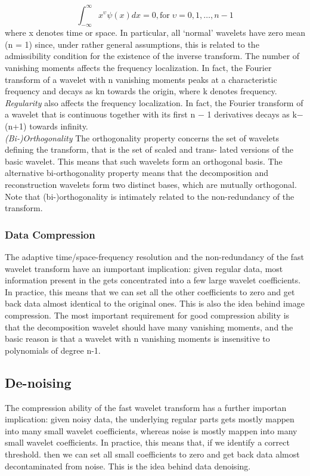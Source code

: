 \documentclass[12pt]{article}
\begin{document}
			\begin{equation}
				\int_{-\infty}^\infty x^\upsilon \psi(x)dx=0, \mathrm{for }\;\upsilon = 0,1, \dots , n −1
			\end{equation}
			where x denotes time or space. In particular, all ‘normal’ wavelets have zero mean (n = 1) since, under rather general assumptions, this is related to the admissibility condition for the existence of the inverse transform. The number of vanishing moments affects the frequency localization. In fact, the Fourier transform of a wavelet with n vanishing moments peaks at a characteristic frequency and decays as kn towards the origin, where k denotes frequency.\\
			\textit{Regularity} also affects the frequency localization. In fact, the Fourier transform of a wavelet that is continuous together with its first n − 1 derivatives decays as k−(n+1) towards infinity.\\
			\textit{(Bi-)Orthogonality} The orthogonality property concerns the set of wavelets defining the transform, that is the set of scaled and trans- lated versions of the basic wavelet. This means that such wavelets form an orthogonal basis. The alternative bi-orthogonality property means that the decomposition and reconstruction wavelets form two distinct bases, which are mutually orthogonal. Note that (bi-)orthogonality is intimately related to the non-redundancy of the transform.

	    \subsubsection{Data Compression}
	    The adaptive time/space-frequency resolution and the non-redundancy of the fast wavelet transform have an iumportant implication: 
	    given regular data, most information present in the gets concentrated into a few large
	    wavelet coefficients. In practice, this means that we can set all the
	    other coefficients to zero and get back data almost identical to the
	    original ones. This is also the idea behind image compression. The most
	    important requirement for good compression ability is that the
	    decomposition wavelet should have many vanishing moments, and the basic
	    reason is that a wavelet with n vanishing moments is insensitive to
	    polynomials of degree n-1. 
	    
	    \subsection{De-noising}
	    The compression ability of the fast wavelet transform has a further
	    importan implication: given noisy data, the underlying regular parts gets
	    mostly mappen into many small wavelet coefficients, whereas noise is
	    mostly mappen into many small wavelet coefficients. In practice, this
	    means that, if we identify a correct threshold. then we can set all small
	    coefficients to zero and get back data almost decontaminated from noise.
	    This is the idea behind data denoising.
%	
%
\end{document}
